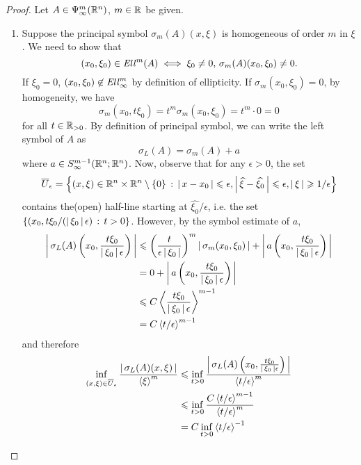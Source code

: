 \documentclass[12pt]{article}
\begin{document}
\begin{proof}
    Let $A \in \Psi^m_\infty(\R^n)$, $m \in \R$ be given. 
    \begin{enumerate}
        \item Suppose the principal symbol $\sigma_m(A)(x, \xi)$ is homogeneous of order $m$ in $\xi$. We need to show that 
        \[
        (x_0, \xi_0) \in \Ell^m(A) \iff \xi_0 \neq 0, \, \sigma_m(A)(x_0, \xi_0) \neq 0. 
        \]
        If $\xi_0 = 0$, $(x_0, \xi_0) \not \in \Ell^m_\infty$ by definition of ellipticity. If $\sigma_m(x_0, \xi_0) = 0$, by homogeneity, we have 
        \[
        \sigma_m(x_0, t \xi_0) = t^m \sigma_m(x_0, \xi_0) = t^m \cdot 0 = 0
        \]
        for all $t \in \R_{> 0}$. By definition of principal symbol, we can write the left symbol of $A$ as 
        \[
        \sigma_L(A) = \sigma_m(A) + a
        \]
        where $a \in S^{m -1}_\infty(\R^n; \R^n)$. Now, observe that for any $\epsilon > 0$, the set 
        \[
        \overline{U}_\epsilon = \set{(x, \xi) \in \R^n \times \R^n \setminus \set{0} \wh \abs{x - x_0} \leq \epsilon, \abs{\widehat{\xi} - \widehat{\xi_0}} \leq \epsilon, \abs{\xi} \geq 1/\epsilon}
        \]
        contains the(open) half-line starting at $\widehat{\xi_0} / \epsilon$, i.e. the set $\set{(x_0, t \xi_0/(\abs{\xi_0}\epsilon)\wh t > 0}$. However, by the symbol estimate of $a$, 
        \begin{align*}
            \abs{\sigma_L(A)\brac{x_0, \frac{t \xi_0}{\abs{\xi_0} \epsilon}}}
            & \leq \brac{\frac{t}{\epsilon \abs{\xi_0}}}^m \abs{\sigma_m(x_0, \xi_0)} + \abs{a\brac{x_0, \frac{t \xi_0}{\abs{\xi_0} \epsilon}}} \\
            & = 0 + \abs{a\brac{x_0, \frac{t \xi_0}{\abs{\xi_0} \epsilon}}} \\
            & \leq C \sym[\frac{t \xi_0}{\abs{\xi_0} \epsilon}]^{m - 1} \\
            & = C\sym[t/\epsilon]^{m - 1}
        \end{align*}
        and therefore 
        \begin{align*}
            \inf_{(x, \xi) \in \overline{U}_\epsilon} \frac{\abs{\sigma_L(A)(x, \xi)}}{\sym[\xi]^m} 
            & \leq \inf_{t > 0}  \frac{\abs{\sigma_L(A)\brac{x_0, \frac{t \xi_0}{\abs{\xi_0} \epsilon}}} }{\sym[t /\epsilon]^m} \\
            & \leq \inf_{t > 0}  \frac{C\sym[t/ \epsilon]^{m - 1} }{\sym[t /\epsilon]^m} \\
            & = C\inf_{t > 0} \sym[t/\epsilon]^{-1}\\

\end{align*}
\end{enumerate}
\end{proof}
\end{document}
